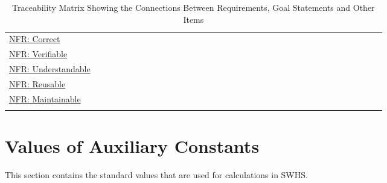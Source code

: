 \documentclass[12pt]{article}
\begin{document}
\begin{longtable}{l l l l l l l l l l l l l l l l l l l l l l l l l l l l l l l l l l l}
\hyperref[correct]{NFR: Correct} &  &  &  &  &  &  &  &  &  &  &  &  &  &  &  &  &  &  &  &  &  &  &  &  &  &  &  &  &  &  &  &  &  & 
\\
\hyperref[verifiable]{NFR: Verifiable} &  &  &  &  &  &  &  &  &  &  &  &  &  &  &  &  &  &  &  &  &  &  &  &  &  &  &  &  &  &  &  &  &  & 
\\
\hyperref[understandable]{NFR: Understandable} &  &  &  &  &  &  &  &  &  &  &  &  &  &  &  &  &  &  &  &  &  &  &  &  &  &  &  &  &  &  &  &  &  & 
\\
\hyperref[reusable]{NFR: Reusable} &  &  &  &  &  &  &  &  &  &  &  &  &  &  &  &  &  &  &  &  &  &  &  &  &  &  &  &  &  &  &  &  &  & 
\\
\hyperref[maintainable]{NFR: Maintainable} &  &  &  &  &  &  &  &  &  &  &  &  &  &  &  &  &  &  &  &  &  &  &  &  &  &  &  &  &  &  &  &  &  & 
\\
\bottomrule
\caption{Traceability Matrix Showing the Connections Between Requirements, Goal Statements and Other Items}
\label{Table:TraceMatAllvsR}
\end{longtable}
\section{Values of Auxiliary Constants}
\label{Sec:AuxConstants}
This section contains the standard values that are used for calculations in SWHS.
\end{document}
